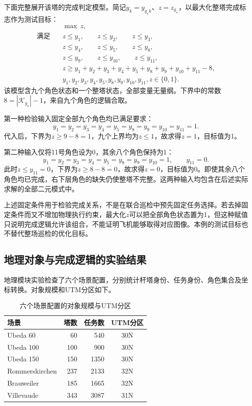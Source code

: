 下面完整展开该塔的完成判定模型。简记$y_k=y_{g_\star k}$、$z=z_{g_\star}$，以最大化整塔完成标志作为测试目标：
\begin{subequations}
\begin{align}
 &\max\ z,\\
 \text{满足}\quad
 &z\leq y_1,\qquad z\leq y_2,\qquad z\leq y_3,\\
 &z\leq y_4,\qquad z\leq y_5,\qquad z\leq y_8,\\
 &z\leq y_9,\qquad z\leq y_{10},\qquad z\leq y_{11},\\
 &z\geq y_1+y_2+y_3+y_4+y_5+y_8+y_9+y_{10}+y_{11}-8,\\
 &y_1,y_2,y_3,y_4,y_5,y_8,y_9,y_{10},y_{11},z\in\{0,1\}.
\end{align}
\end{subequations}
该模型含九个角色状态和一个整塔状态，全部变量无量纲。下界中的常数$8=|\mathcal K_{g_\star}|-1$，来自九个角色的逻辑合取。

第一种检验输入固定全部九个角色均已满足要求：
\begin{equation}
 y_1=y_2=y_3=y_4=y_5=y_8=y_9=y_{10}=y_{11}=1.
\end{equation}
代入后，下界为$z\geq9-8=1$，九个上界均为$z\leq1$，故求得$z=1$，目标值为1。

第二种输入仅将11号角色设为0，其余八个角色保持为1：
\begin{equation}
 y_1=y_2=y_3=y_4=y_5=y_8=y_9=y_{10}=1,
 \qquad y_{11}=0.
\end{equation}
此时$z\leq y_{11}=0$，下界为$z\geq8-8=0$，故求得$z=0$，目标值为0。即使其余八个角色均已完成，右下层角色的缺失仍使整塔不完整。这两种输入均包含在后述实际求解的全部二元模式中。

上述固定条件用于检验完成关系，不是在联合巡检中预先固定任务选择。若去掉固定条件而又不增加物理执行约束，最大化$z$可以把全部角色状态置为1，但这种赋值只说明完成逻辑允许该组合，不能证明飞机能够取得对应图像。本例的测试目标也不替代整场巡检的优化目标。

\subsection{地理对象与完成逻辑的实验结果}

地理模块实验检查了六个场景配置，分别统计杆塔身份、任务身份、角色集合及坐标转换。对象规模和UTM分区如下。
\begin{table}[htbp]
 \centering
 \small
 \caption{六个场景配置的对象规模与UTM分区}
 \begin{tabular}{@{}lrrc@{}}
  \toprule
  场景 & 塔数 & 任务数 & UTM分区\\
  \midrule
  Ubeda 60       & 60  & 540  & 30N\\
  Ubeda 100      & 100 & 900  & 30N\\
  Ubeda 150      & 150 & 1350 & 30N\\
  Rommerskirchen & 237 & 2133 & 32N\\
  Brauweiler     & 185 & 1665 & 32N\\
  Villevaude     & 343 & 3087 & 31N\\
  \bottomrule
 \end{tabular}
\end{table}

